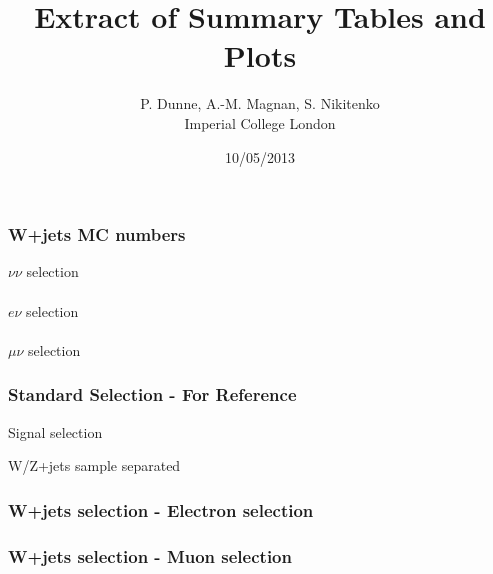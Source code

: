 \documentclass[red,compress,xcolor=table]{beamer}
\title%
{Extract of Summary Tables and Plots}
\subtitle
{} %
\author[A.-M. Magnan] %
{P. Dunne, A.-M. Magnan, S. Nikitenko\\
  Imperial College London}
\date[10/05/2013] %
{10/05/2013}
\begin{document}
\begin{frame}
  \titlepage
\end{frame}

\begin{frame}
  \frametitle{W+jets MC numbers}

{\tiny
\centering $\nu\nu$ selection\\
\\
\centering $e\nu$ selection\\
\\
\centering $\mu\nu$ selection\\

}

\end{frame}

\begin{frame}
  \frametitle{Standard Selection - For Reference}

\begin{center}
\centering Signal selection\\
{\tiny
\hspace*{-1cm}

}
\centering W/Z+jets sample separated\\
  {\tiny
    
  }

\end{center}

\end{frame}

\begin{frame}
  \frametitle{W+jets selection -  Electron selection}

\vspace*{-1cm}
\begin{center}
{\tiny
\hspace*{-1cm}

}
\end{center}


\end{frame}
\begin{frame}
  \frametitle{W+jets selection -  Muon selection}

\vspace*{-1cm}
\begin{center}
{\tiny
\hspace*{-1cm}

}
\end{center}


\end{frame}
\end{document}
